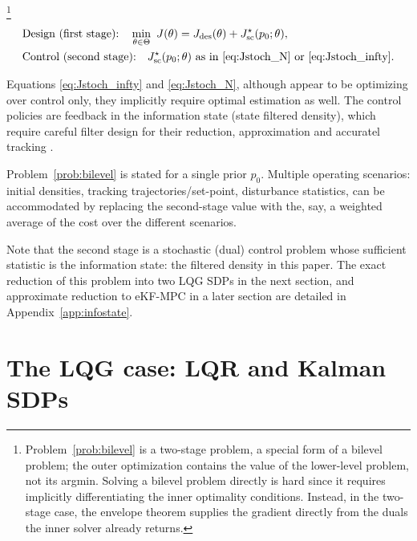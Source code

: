 \documentclass[twocolumn,amsthm]{autart}
\begin{document}
\begin{prob}[ContEst]\footnote{Problem~\ref{prob:bilevel} is a two-stage problem, a special form of a bilevel problem; the outer optimization contains the value of the lower-level problem, not its argmin. Solving a bilevel problem directly is hard since it requires implicitly differentiating the inner optimality conditions. Instead, in the two-stage case, the envelope theorem supplies the gradient
directly from the duals the inner solver already returns.}\label{prob:bilevel}
\begin{align*}
&\text{Design (first stage):}\quad \min_{\theta \in \Theta}\
J(\theta) = J_{\mathrm{des}}(\theta) + J_{\mathrm{sc}}^\star(p_0;\theta),\\
&\text{Control (second stage):}\quad J_{\mathrm{sc}}^\star(p_0;\theta)\ \text{as in
\eqref{eq:Jstoch_N} or \eqref{eq:Jstoch_infty}}.
\end{align*}
\end{prob}

\begin{rem}
    Equations \eqref{eq:Jstoch_infty} and \eqref{eq:Jstoch_N}, although appear to be optimizing over control only, they implicitly require optimal estimation as well. The control policies are feedback in the information state (state filtered density), which require careful filter design for their reduction, approximation and accuratel tracking \cite{kumar2015stochastic}.
\end{rem}

\begin{rem}\label{rem:scenarios}
Problem~\ref{prob:bilevel} is stated for a single prior $p_0$. Multiple operating scenarios: initial densities, tracking trajectories/set-point, disturbance statistics, can be accommodated by replacing the second-stage value with the, say, a weighted average of the cost over the different scenarios.
\end{rem}

Note that the second stage is a stochastic (dual) control problem whose sufficient
statistic is the information state: the filtered density in this paper. The exact reduction of this problem into two LQG SDPs in the next section, and approximate reduction to eKF-MPC in a later section are detailed in Appendix~\ref{app:infostate}.

\section{The LQG case: LQR and Kalman SDPs}\label{sec:lqg}
\end{document}
